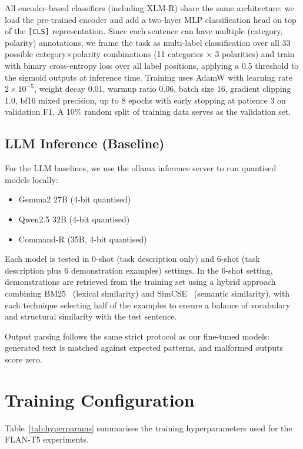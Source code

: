 \documentclass[12pt,a4paper]{report}
\begin{document}
All encoder-based classifiers (including XLM-R) share the same architecture: we load the pre-trained encoder and add a two-layer MLP classification head on top of the \texttt{[CLS]} representation. Since each sentence can have multiple (category, polarity) annotations, we frame the task as multi-label classification over all 33 possible category$\times$polarity combinations (11 categories $\times$ 3 polarities) and train with binary cross-entropy loss over all label positions, applying a 0.5 threshold to the sigmoid outputs at inference time. Training uses AdamW with learning rate $2 \times 10^{-5}$, weight decay 0.01, warmup ratio 0.06, batch size 16, gradient clipping 1.0, bf16 mixed precision, up to 8 epochs with early stopping at patience 3 on validation F1. A 10\% random split of training data serves as the validation set.

\subsection{LLM Inference (Baseline)}

For the LLM baselines, we use the ollama inference server to run quantised models locally:
\begin{itemize}
    \item Gemma2 27B (4-bit quantised)
    \item Qwen2.5 32B (4-bit quantised)
    \item Command-R (35B, 4-bit quantised)
\end{itemize}

Each model is tested in 0-shot (task description only) and 6-shot (task description plus 6 demonstration examples) settings. In the 6-shot setting, demonstrations are retrieved from the training set using a hybrid approach combining BM25~\cite{robertson2009bm25} (lexical similarity) and SimCSE~\cite{gao2021simcse} (semantic similarity), with each technique selecting half of the examples to ensure a balance of vocabulary and structural similarity with the test sentence.

Output parsing follows the same strict protocol as our fine-tuned models: generated text is matched against expected patterns, and malformed outputs score zero.


\section{Training Configuration}

Table~\ref{tab:hyperparams} summarises the training hyperparameters used for the FLAN-T5 experiments.
\end{document}
